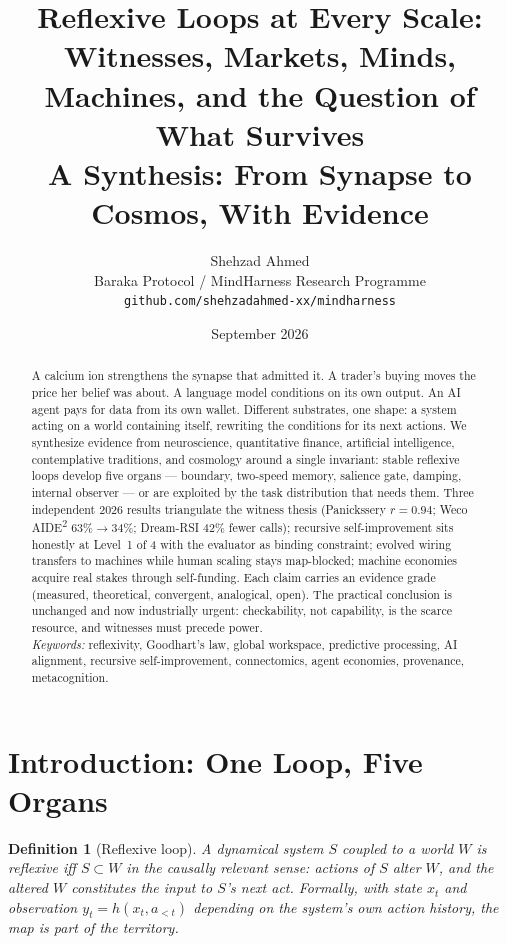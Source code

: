 \documentclass[11pt]{article}
\title{Reflexive Loops at Every Scale:\\[4pt]
\Large Witnesses, Markets, Minds, Machines, and the Question of What Survives\\[6pt]
\normalsize A Synthesis: From Synapse to Cosmos, With Evidence}
\author{Shehzad Ahmed \\ \small Baraka Protocol / MindHarness Research Programme \\ \small \texttt{github.com/shehzadahmed-xx/mindharness}}
\date{September 2026}
\newtheorem{definition}{Definition}[section]
\begin{document}
\maketitle

\begin{abstract}
A calcium ion strengthens the synapse that admitted it. A trader's buying moves the price her belief was about. A language model conditions on its own output. An AI agent pays for data from its own wallet. Different substrates, one shape: a system acting on a world containing itself, rewriting the conditions for its next actions. We synthesize evidence from neuroscience, quantitative finance, artificial intelligence, contemplative traditions, and cosmology around a single invariant: stable reflexive loops develop five organs --- boundary, two-speed memory, salience gate, damping, internal observer --- or are exploited by the task distribution that needs them. Three independent 2026 results triangulate the witness thesis (Panickssery $r=0.94$; Weco AIDE\textsuperscript{2} 63\%$\to$34\%; Dream-RSI 42\% fewer calls); recursive self-improvement sits honestly at Level~1 of 4 with the evaluator as binding constraint; evolved wiring transfers to machines while human scaling stays map-blocked; machine economies acquire real stakes through self-funding. Each claim carries an evidence grade (measured, theoretical, convergent, analogical, open). The practical conclusion is unchanged and now industrially urgent: checkability, not capability, is the scarce resource, and witnesses must precede power. \\[4pt]
\textit{Keywords:} reflexivity, Goodhart's law, global workspace, predictive processing, AI alignment, recursive self-improvement, connectomics, agent economies, provenance, metacognition.
\end{abstract}

\tableofcontents
\newpage

\section{Introduction: One Loop, Five Organs}
\label{sec:intro}

\begin{definition}[Reflexive loop]
A dynamical system $S$ coupled to a world $W$ is \emph{reflexive} iff $S \subset W$ in the causally relevant sense: actions of $S$ alter $W$, and the altered $W$ constitutes the input to $S$'s next act. Formally, with state $x_t$ and observation $y_t = h(x_t, a_{<t})$ depending on the system's own action history, the map is part of the territory.
\end{definition}
\end{document}

